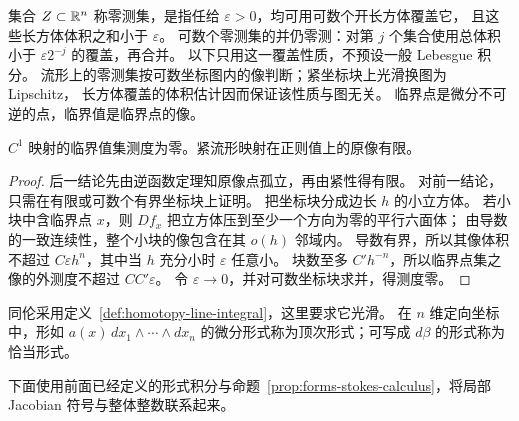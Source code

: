 \begin{definition}[零测集的覆盖意义]
集合 $Z\subset\mathbb{R}^n$ 称零测集，是指任给 $\varepsilon>0$，均可用可数个开长方体覆盖它，
且这些长方体体积之和小于 $\varepsilon$。
可数个零测集的并仍零测：对第 $j$ 个集合使用总体积小于 $\varepsilon2^{-j}$ 的覆盖，再合并。
以下只用这一覆盖性质，不预设一般 Lebesgue 积分。
流形上的零测集按可数坐标图内的像判断；紧坐标块上光滑换图为 Lipschitz，
长方体覆盖的体积估计因而保证该性质与图无关。
临界点是微分不可逆的点，临界值是临界点的像。
\end{definition}

\begin{lemma}[同维情形的正则值]
$C^1$ 映射的临界值集测度为零。紧流形映射在正则值上的原像有限。
\end{lemma}
\begin{proof}
后一结论先由逆函数定理知原像点孤立，再由紧性得有限。
对前一结论，只需在有限或可数个有界坐标块上证明。
把坐标块分成边长 $h$ 的小立方体。
若小块中含临界点 $x$，则 $Df_x$ 把立方体压到至少一个方向为零的平行六面体；
由导数的一致连续性，整个小块的像包含在其 $o(h)$ 邻域内。
导数有界，所以其像体积不超过 $C\varepsilon h^n$，其中当 $h$ 充分小时 $\varepsilon$ 任意小。
块数至多 $C'h^{-n}$，所以临界点集之像的外测度不超过 $CC'\varepsilon$。
令 $\varepsilon\to0$，并对可数坐标块求并，得测度零。
\end{proof}
\begin{definition}[顶次形式]
同伦采用定义~\ref{def:homotopy-line-integral}，这里要求它光滑。
在 $n$ 维定向坐标中，形如 $a(x)\,dx_1\wedge\cdots\wedge dx_n$ 的微分形式称为顶次形式；可写成 $d\beta$ 的形式称为恰当形式。
\end{definition}

下面使用前面已经定义的形式积分与命题~\ref{prop:forms-stokes-calculus}，将局部 Jacobian 符号与整体整数联系起来。


